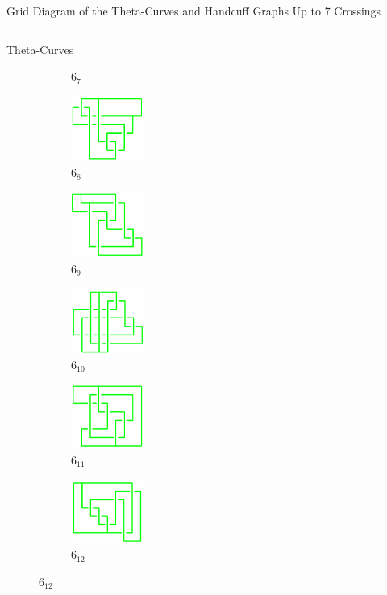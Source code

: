 \documentclass[final]{beamer}
\begin{document}
\begin{frame}[t]
\begin{alertblock}{Grid Diagram of the Theta-Curves and Handcuff Graphs Up to 7 Crossings}
\begin{columns}[t]
\begin{column}{0.6\textwidth}
\begin{alertblock}{Theta-Curves}
\begin{figure}
\begin{subfigure}{0.075\textwidth}
    \caption{$6_7$} 
    \end{subfigure}
      \begin{subfigure}{0.075\textwidth}
    \includegraphics[width=2.4cm]{../Midterm_Poster/grid_diagram/theta_6_8.png}
    \caption{$6_8$} 
    \end{subfigure}
    \begin{subfigure}{0.075\textwidth}
    \includegraphics[width=2.4cm]{../Midterm_Poster/grid_diagram/theta_6_9.png}
    \caption{$6_9$} 
    \end{subfigure}
    \begin{subfigure}{0.075\textwidth}
    \includegraphics[width=2.4cm]{../Midterm_Poster/grid_diagram/theta_6_10.png}
    \caption{$6_{10}$} 
    \end{subfigure}
    \begin{subfigure}{0.075\textwidth}
    \includegraphics[width=2.4cm]{../Midterm_Poster/grid_diagram/theta_6_11.png}
    \caption{$6_{11}$} 
    \end{subfigure}
    \begin{subfigure}{0.075\textwidth}
    \includegraphics[width=2.4cm]{../Midterm_Poster/grid_diagram/theta_6_12.png}
    \caption{$6_{12}$} 
    \end{subfigure}

\end{figure}
\end{alertblock}
\end{column}
\end{columns}
\end{alertblock}
\end{frame}
\end{document}
